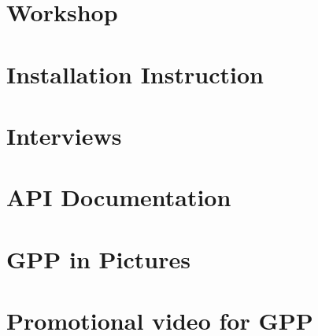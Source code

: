  \appendix

\chapter{Workshop}


\chapter{Installation Instruction}


\chapter{Interviews}


\chapter{API Documentation}


\chapter{GPP in Pictures}


\chapter{Promotional video for GPP}

